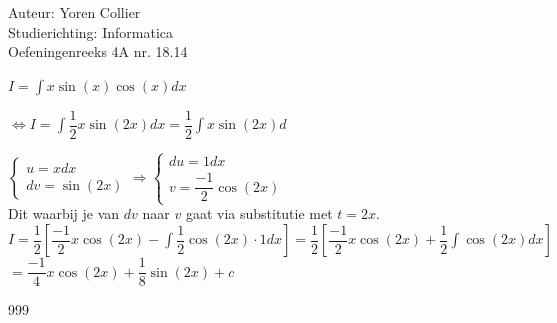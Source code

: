 \documentclass[a4paper]{article}
\newcommand{\asa}{\Leftrightarrow} %
\newcommand{\adR}{\Rightarrow} %
\newcommand{\Lh}{\left(} %
\newcommand{\Rh}{\right)}
\newcommand{\Lv}{\left[} %
\newcommand{\Rv}{\right]}
\newcommand{\La}{\left\{} %
\newcommand{\Ras}{\right.} %
\newcommand{\intgrl}{\displaystyle\int} %
\begin{document}
\noindent \large Auteur: Yoren Collier \\
\noindent \large Studierichting: Informatica\\
\noindent \large Oefeningenreeks 4A nr. 18.14\\

\medskip

\normalsize

$ I =  \intgrl x \sin \Lh x \Rh \cos \Lh x \Rh dx $

$\asa I = \intgrl\dfrac{1}{2}x \sin \Lh 2x \Rh dx = \dfrac{1}{2} \intgrl x \sin \Lh 2x \Rh d$

$\La
\begin{array}{l}
u = x dx  \\
dv = \sin \Lh 2x \Rh  
\end{array}
\Ras
\adR
\La
\begin{array}{l}
du = 1 dx  \\
v = \dfrac{-1}{2} \cos \Lh 2x \Rh  
\end{array}
\Ras$\\

Dit waarbij je van $dv$ naar $v$ gaat via substitutie met $t = 2x$.\\

$I = \dfrac{1}{2} \Lv \dfrac{-1}{2}x \cos \Lh 2x \Rh - \intgrl \dfrac{1}{2} \cos \Lh 2x \Rh \cdot 1 dx \Rv = \dfrac{1}{2} \Lv \dfrac{-1}{2}x \cos \Lh 2x \Rh + \dfrac{1}{2} \intgrl \cos \Lh 2x \Rh dx \Rv$\\

$= \dfrac{-1}{4}x \cos \Lh 2x \Rh + \dfrac{1}{8} \sin \Lh 2x \Rh +c $\\

\begin{thebibliography}{999}
\end{thebibliography}
\end{document}
